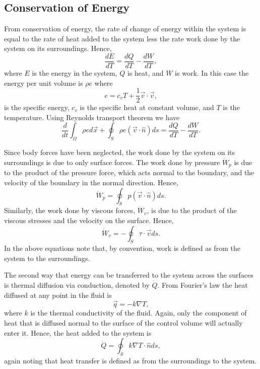 \subsection{Conservation of Energy}
From conservation of energy, the rate of change of energy within the system is equal to the rate of heat added to the system less the rate work done by the system on its surroundings. Hence,
\begin{equation}
	\frac{dE}{dT} = \frac{dQ}{dT} - \frac{dW}{dT},
\end{equation}
where $E$ is the energy in the system, $Q$ is heat, and $W$ is work. In this case the energy per unit volume is $\rho e$ where 
\begin{equation}
e = c_v T + \frac{1}{2} \vec{v} \cdot \vec{v},
\end{equation} 
is the specific energy, $c_v$ is the specific heat at constant volume, and $T$ is the temperature. Using Reynolds transport theorem we have
\begin{equation}
\frac{d}{dt}\int_\Omega \rho e d\vec{x} + \oint_S \rho e (\vec{v} \cdot \hat{n}) ds = \frac{dQ}{dT} - \frac{dW}{dT}.
\end{equation}

Since body forces have been neglected, the work done by the system on its surroundings is due to only surface forces. The work done by pressure $\dot{W}_p$ is due to the product of the pressure force, which acts normal to the boundary, and the velocity of the boundary in the normal direction. Hence,
\begin{equation}
	\dot{W}_p = \oint_S p(\vec{v} \cdot \hat{n}) ds.
\end{equation}
Similarly, the work done by viscous forces, $\dot{W}_v$, is due to the product of the viscous stresses and the velocity on the surface. Hence, 
\begin{equation}
	\dot{W}_v = -\oint_S \tau \cdot \vec{v} ds.
\end{equation}
In the above equations note that, by convention, work is defined as from the system to the surroundings.

The second way that energy can be transferred to the system across the surfaces is thermal diffusion via conduction, denoted by $\dot{Q}$. From Fourier's law the heat diffused at any point in the fluid is
\begin{equation}
	\vec{q} = -k \nabla T,
\end{equation}
where $k$ is the thermal conductivity of the fluid. Again, only the component of heat that is diffused normal to the surface of the control volume will actually enter it. Hence, the heat added to the system is
\begin{equation}
	\dot{Q} = \oint_S k \nabla T \cdot \hat{n} ds,
\end{equation}
again noting that heat transfer is defined as from the surroundings to the system.

